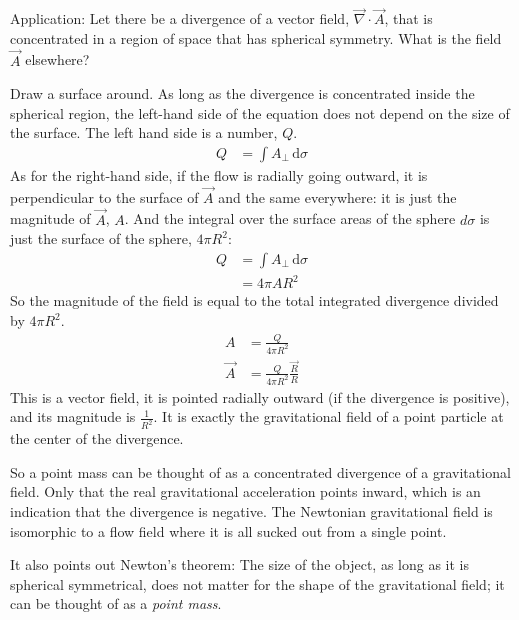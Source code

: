 \documentclass[pagesize,headsepline,10pt,parskip=half,BCOR=12mm]{scrreprt}
\begin{document}
        Application: Let there be a divergence of a vector
        field, $\vec \nabla \cdot \vec A$, that is concentrated in
        a region of space that has spherical symmetry.  What is the
        field $\vec A$ elsewhere?

        Draw a surface around.  As long as the divergence is
        concentrated inside the spherical region, the left-hand
        side of the equation does not depend on the size of the
        surface.  The left hand side is a number, $Q$.
        \begin{align}\label{eq:gauss2}
          Q &= \int A_\perp \, \mathrm{d}\sigma
        \end{align}
        As for the right-hand side, if the flow is radially going
        outward, it is perpendicular to the surface of $\vec A$
        and the same everywhere: it is just the magnitude of
        $\vec A$, $A$.  And the integral over the surface areas of
        the sphere $d \sigma$ is just the surface of the sphere,
        $4 \pi R^2$:
        \begin{align}
          Q &= \int A_\perp \, \mathrm{d}\sigma \\
            &= 4 \pi A R^2
        \end{align}
        So the magnitude of the field is equal to the total
        integrated divergence divided by $4\pi R^2$.
        \begin{align}
          A &= \frac{Q}{4 \pi R^2} \\
          \vec A &= \frac{Q}{4 \pi R^2} \frac{\vec R}{R}
        \end{align}
        This is a vector field, it is pointed radially outward (if
        the divergence is positive), and its magnitude is
        $\frac{1}{R^2}$.  It is exactly the gravitational field of
        a point particle at the center of the divergence.

        So a point mass can be thought of as a concentrated
        divergence of a gravitational field.  Only that the real
        gravitational acceleration points inward, which is an
        indication that the divergence is negative.  The Newtonian
        gravitational field is isomorphic to a flow field where it
        is all sucked out from a single point.

        It also points out Newton's theorem: The size of the
        object, as long as it is spherical symmetrical, does not
        matter for the shape of the gravitational field; it can be
        thought of as a \emph{point mass}.
\end{document}
